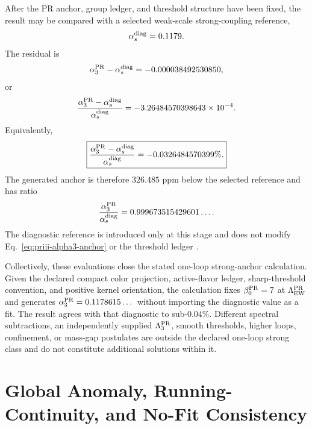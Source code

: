 \documentclass[11pt]{article}
\begin{document}
After the PR anchor, group ledger, and threshold structure have been fixed, the result may be compared with a selected weak-scale strong-coupling reference,
\begin{equation}
\alpha_s^{\rm diag}
=
0.1179.
\end{equation}
The residual is
\begin{equation}
\alpha_3^{\rm PR}-\alpha_s^{\rm diag}
=
-0.000038492530850,
\end{equation}
or
\begin{equation}
\frac{
\alpha_3^{\rm PR}-\alpha_s^{\rm diag}
}{
\alpha_s^{\rm diag}
}
=
-3.26484570398643\times10^{-4}.
\end{equation}
Equivalently,
\begin{equation}
\boxed{
\frac{
\alpha_3^{\rm PR}-\alpha_s^{\rm diag}
}{
\alpha_s^{\rm diag}
}
=
-0.0326484570399\%.
}
\label{eq:priii-strong-relative-residual}
\end{equation}
The generated anchor is therefore \(326.485\) ppm below the selected reference and has ratio
\begin{equation}
\frac{\alpha_3^{\rm PR}}{\alpha_s^{\rm diag}}
=
0.999673515429601\ldots .
\end{equation}
The diagnostic reference is introduced only at this stage and does not modify Eq.~\eqref{eq:priii-alpha3-anchor} or the threshold ledger \cite{PDG2024}.

Collectively, these evaluations close the stated one-loop strong-anchor
calculation.  Given the declared compact color projection, active-flavor
ledger, sharp-threshold convention, and positive kernel orientation, the
calculation fixes \(\beta_0^{\rm PR}=7\) at \(\Lambda_{\rm EW}^{\rm PR}\) and generates \(\alpha_3^{\rm PR}=0.1178615\dots\) without importing the diagnostic value as a fit.  The result agrees with that diagnostic to sub-\(0.04\%\). Different spectral subtractions, an independently supplied \(\Lambda_3^{\rm PR}\), smooth thresholds, higher loops, confinement, or mass-gap postulates are outside the declared one-loop strong class and do not constitute additional solutions within it.

\section{Global Anomaly, Running-Continuity, and No-Fit Consistency}
\label{sec:priii-global-consistency}
\end{document}
